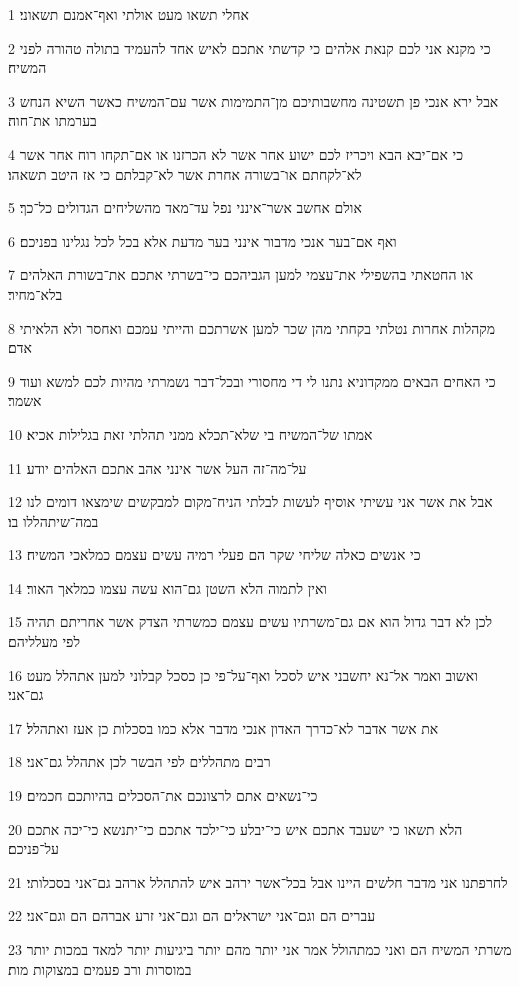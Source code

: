 \par 1 אחלי תשאו מעט אולתי ואף־אמנם תשאוני׃
\par 2 כי מקנא אני לכם קנאת אלהים כי קדשתי אתכם לאיש אחד להעמיד בתולה טהורה לפני המשיח׃
\par 3 אבל ירא אנכי פן תשטינה מחשבותיכם מן־התמימות אשר עם־המשיח כאשר השיא הנחש בערמתו את־חוה׃
\par 4 כי אם־יבא הבא ויכריז לכם ישוע אחר אשר לא הכרזנו או אם־תקחו רוח אחר אשר לא־לקחתם או־בשורה אחרת אשר לא־קבלתם כי אז היטב תשאהו׃
\par 5 אולם אחשב אשר־אינני נפל עד־מאד מהשליחים הגדולים כל־כך׃
\par 6 ואף אם־בער אנכי מדבור אינני בער מדעת אלא בכל לכל נגלינו בפניכם׃
\par 7 או החטאתי בהשפילי את־עצמי למען הגביהכם כי־בשרתי אתכם את־בשורת האלהים בלא־מחיר׃
\par 8 מקהלות אחרות נטלתי בקחתי מהן שכר למען אשרתכם והייתי עמכם ואחסר ולא הלאיתי אדם׃
\par 9 כי האחים הבאים ממקדוניא נתנו לי די מחסורי ובכל־דבר נשמרתי מהיות לכם למשא ועוד אשמר׃
\par 10 אמתו של־המשיח בי שלא־תכלא ממני תהלתי זאת בגלילות אכיא׃
\par 11 על־מה־זה העל אשר אינני אהב אתכם האלהים יודע׃
\par 12 אבל את אשר אני עשיתי אוסיף לעשות לבלתי הניח־מקום למבקשים שימצאו דומים לנו במה־שיתהללו בו׃
\par 13 כי אנשים כאלה שליחי שקר הם פעלי רמיה עשים עצמם כמלאכי המשיח׃
\par 14 ואין לתמוה הלא השטן גם־הוא עשה עצמו כמלאך האור׃
\par 15 לכן לא דבר גדול הוא אם גם־משרתיו עשים עצמם כמשרתי הצדק אשר אחריתם תהיה לפי מעלליהם׃
\par 16 ואשוב ואמר אל־נא יחשבני איש לסכל ואף־על־פי כן כסכל קבלוני למען אתהלל מעט גם־אני׃
\par 17 את אשר אדבר לא־כדרך האדון אנכי מדבר אלא כמו בסכלות כן אעז ואתהלל׃
\par 18 רבים מתהללים לפי הבשר לכן אתהלל גם־אני׃
\par 19 כי־נשאים אתם לרצונכם את־הסכלים בהיותכם חכמים׃
\par 20 הלא תשאו כי ישעבד אתכם איש כי־יבלע כי־ילכד אתכם כי־יתנשא כי־יכה אתכם על־פניכם׃
\par 21 לחרפתנו אני מדבר חלשים היינו אבל בכל־אשר ירהב איש להתהלל ארהב גם־אני בסכלותי׃
\par 22 עברים הם וגם־אני ישראלים הם וגם־אני זרע אברהם הם וגם־אני׃
\par 23 משרתי המשיח הם ואני כמתהולל אמר אני יותר מהם יותר ביגיעות יותר למאד במכות יותר במוסרות ורב פעמים במצוקות מות׃
